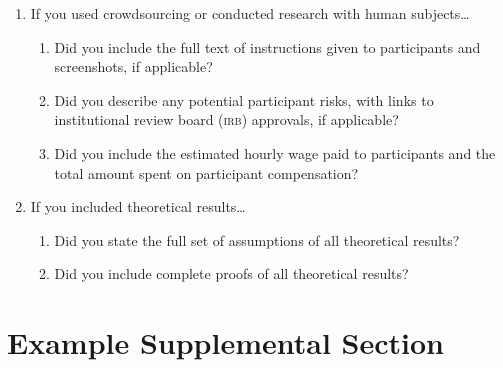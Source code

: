 \documentclass[11pt]{article}
\begin{document}
\begin{enumerate}
  \begin{enumerate}
    \item Did you mention the license of the new assets (e.g., as part of your
    code submission)?
    \answerTODO{}
    \item Did you include the new assets either in the supplemental material or as
    a \textsc{url} (to, e.g., GitHub or Hugging Face)?
    \answerTODO{}
  \end{enumerate}
\item If you used crowdsourcing or conducted research with human subjects\dots
  \begin{enumerate}
  \item Did you include the full text of instructions given to participants and
    screenshots, if applicable?
    \answerTODO{}
  \item Did you describe any potential participant risks, with links to
    institutional review board (\textsc{irb}) approvals, if applicable?
    \answerTODO{}
  \item Did you include the estimated hourly wage paid to participants and the
    total amount spent on participant compensation?
    \answerTODO{}
  \end{enumerate}
\item If you included theoretical results\dots
  \begin{enumerate}
  \item Did you state the full set of assumptions of all theoretical results?
    \answerTODO{}
  \item Did you include complete proofs of all theoretical results?
    \answerTODO{}
  \end{enumerate}
\end{enumerate}

\newpage
\appendix


\section{Example Supplemental Section}
\end{document}
